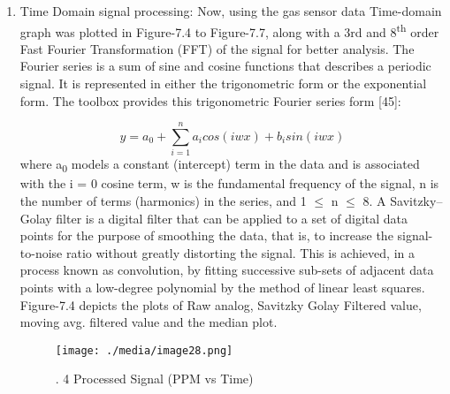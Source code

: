 \begin{enumerate}
\par

\par

	\item Time Domain signal processing: Now, using the gas sensor data Time-domain graph was plotted in Figure-7.4 to Figure-7.7, along with a 3rd and 8\textsuperscript{th} order Fast Fourier Transformation (FFT) of the signal for better analysis. The Fourier series is a sum of sine and cosine functions that describes a periodic signal. It is represented in either the trigonometric form or the exponential form. The toolbox provides this trigonometric Fourier series form [45]:\par


\begin{equation}\tag{5}
y=a_{0}+ \sum _{i=1}^{n}a_{i}cos \left( iwx \right) +b_{i}sin \left( iwx \right)
\end{equation}
\setlength{\parskip}{8.04pt}
where a\textsubscript{0} models a constant (intercept) term in the data and is associated with the i = 0 cosine term, w is the fundamental frequency of the signal, n is the number of terms (harmonics) in the series, and 1 $ \leq $  n $ \leq $  8. A Savitzky–Golay filter is a digital filter that can be applied to a set of digital data points for the purpose of smoothing the data, that is, to increase the signal-to-noise ratio without greatly distorting the signal. This is achieved, in a process known as convolution, by fitting successive sub-sets of adjacent data points with a low-degree polynomial by the method of linear least squares. Figure-7.4 depicts the plots of Raw analog, Savitzky Golay Filtered value, moving avg. filtered value and the median plot.\par




\begin{figure}[H]
	\begin{Center}
		\texttt{[image: ./media/image28.png]}
		\caption{. 4 Processed Signal (PPM vs Time)}
		\label{fig:_4_Processed_Signal_PPM_vs_Time}
	\end{Center}
\end{figure}



\setlength{\parskip}{0.0pt}
\par


\end{enumerate}
